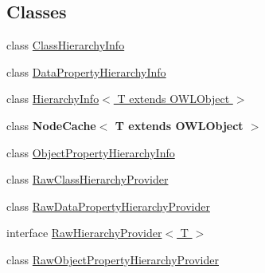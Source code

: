 \subsection*{Classes}
\begin{DoxyCompactItemize}
\item 
class \hyperlink{classorg_1_1semanticweb_1_1owlapi_1_1reasoner_1_1structural_1_1_structural_reasoner_1_1_class_hierarchy_info}{Class\-Hierarchy\-Info}
\item 
class \hyperlink{classorg_1_1semanticweb_1_1owlapi_1_1reasoner_1_1structural_1_1_structural_reasoner_1_1_data_property_hierarchy_info}{Data\-Property\-Hierarchy\-Info}
\item 
class \hyperlink{classorg_1_1semanticweb_1_1owlapi_1_1reasoner_1_1structural_1_1_structural_reasoner_1_1_hierarch7d8ade138c58c437609a51314b153fe1}{Hierarchy\-Info$<$ T extends O\-W\-L\-Object $>$}
\item 
class {\bfseries Node\-Cache$<$ T extends O\-W\-L\-Object $>$}
\item 
class \hyperlink{classorg_1_1semanticweb_1_1owlapi_1_1reasoner_1_1structural_1_1_structural_reasoner_1_1_object_property_hierarchy_info}{Object\-Property\-Hierarchy\-Info}
\item 
class \hyperlink{classorg_1_1semanticweb_1_1owlapi_1_1reasoner_1_1structural_1_1_structural_reasoner_1_1_raw_class_hierarchy_provider}{Raw\-Class\-Hierarchy\-Provider}
\item 
class \hyperlink{classorg_1_1semanticweb_1_1owlapi_1_1reasoner_1_1structural_1_1_structural_reasoner_1_1_raw_data_property_hierarchy_provider}{Raw\-Data\-Property\-Hierarchy\-Provider}
\item 
interface \hyperlink{interfaceorg_1_1semanticweb_1_1owlapi_1_1reasoner_1_1structural_1_1_structural_reasoner_1_1_raw_hierarchy_provider_3_01_t_01_4}{Raw\-Hierarchy\-Provider$<$ T $>$}
\item 
class \hyperlink{classorg_1_1semanticweb_1_1owlapi_1_1reasoner_1_1structural_1_1_structural_reasoner_1_1_raw_object_property_hierarchy_provider}{Raw\-Object\-Property\-Hierarchy\-Provider}
\end{DoxyCompactItemize}
